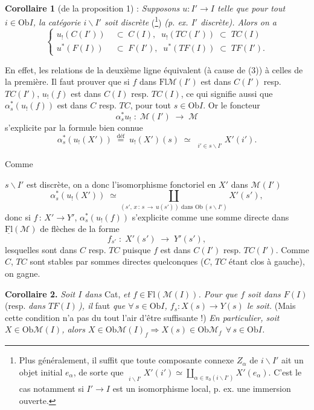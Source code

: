 \documentclass[11pt]{article}
\newcommand{\printedpage}[1]{\marginpar{\footnotesize p.~#1}}
\newcommand{\msp}[1]{\marginpar{\footnotesize [#1]}}
\newcommand{\Fl}{\mathrm{Fl}}
\newcommand{\M}{\mathcal{M}}
\newcommand{\Ob}{\mathrm{Ob}}
\newcommand{\limind}{\mathop{\underrightarrow{\mathrm{lim}}}}
\begin{document}
\textbf{Corollaire 1} (de la proposition 1) : \textit{Supposons $u : I' \longrightarrow I$ telle que pour tout $i \in \Ob I$, la catégorie $i\backslash I'$ soit discrète} (\footnote[27]{Plus généralement, il suffit que toute composante connexe $Z_\alpha$ de $i\backslash I'$ ait un objet initial $e_\alpha$, de sorte que $\limind\limits_{i\backslash I'} X'(i') \simeq \coprod_{\alpha\in\pi_0(i\backslash I')} X'(e_\alpha)$. C'est le cas notamment si $I' \longrightarrow I$ est un isomorphisme local, p. ex. une immersion ouverte.}) \textit{(p. ex. $I'$ discrète). Alors on a}
\[
\left\{
\begin{aligned}
u_{!}(C(I')) \;&\subset\; C(I), \;\; u_{!}(TC(I')) \;\subset\; TC(I)\\
u^*(F(I)) \;&\subset\; F(I'), \;\; u^*(TF(I)) \;\subset\; TF(I').
\end{aligned}
\right.
\]

En effet, les relations de la deuxième ligne équivalent (à cause de (3)) à celles de la première. Il faut prouver que si $f$ dans $\Fl\M(I')$ est dans $C(I')$ resp. $TC(I')$, $u_{!}(f)$ est dans $C(I)$ resp. $TC(I)$, ce qui signifie aussi que $\alpha_s^*(u_{!}(f))$ est dans $C$ resp. $TC$, pour tout $s \in \Ob I$. Or le foncteur
\[
\alpha_s^* u_{!} \;:\; \M(I') \;\longrightarrow\; \M
\]
s'explicite par la formule bien connue
\[
\alpha_s^*(u_{!}(X')) \;\overset{\text{déf}}{=}\; u_{!}(X')(s) \;\simeq\; \limind\limits_{i'\in s\backslash I'} X'(i').
\]

Comme

\noindent\msp{page 48}

\noindent $s\backslash I'$ est discrète, on a donc l'isomorphisme fonctoriel en $X'$ dans $\M(I')$
\[
\alpha_s^*(u_{!}(X')) \;\simeq \coprod_{(s',\, x \,:\, s \,\longrightarrow\, u(s')) \text{ dans } \Ob\,(s\backslash I')} X'(s'),
\]
donc si $f \,:\, X' \longrightarrow Y'$, $\alpha_s^*(u_{!}(f))$ s'explicite comme une somme directe dans $\underline{\mathrm{Fl}}(\M)$ de flèches de la forme
\[
f_{s'} \;:\; X'(s') \;\longrightarrow\; Y'(s'),
\]
\printedpage{28}
lesquelles sont dans $C$ resp. $TC$ puisque $f$ est dans $C(I')$ resp. $TC(I')$. Comme $C$, $TC$ sont stables par sommes directes quelconques ($C$, $TC$ étant clos à gauche), on gagne.

\textbf{Corollaire 2.} \textit{Soit $I$ dans} Cat, \textit{et $f \in \Fl(\M(I))$. Pour que $f$ soit dans $F(I)$} (resp. \textit{dans $TF(I)$\,), il} faut \textit{que $\forall\, s \in \Ob I$, $f_s : X(s) \longrightarrow Y(s)$ le soit.} (Mais cette condition n'a pas du tout l'air d'être suffisante !) \textit{En particulier, soit $X \in \Ob\M(I)$, alors $X \in \Ob\M(I)_f \Longrightarrow X(s) \in \Ob\M_f \ \ \forall\, s \in \Ob I$.}
\end{document}
